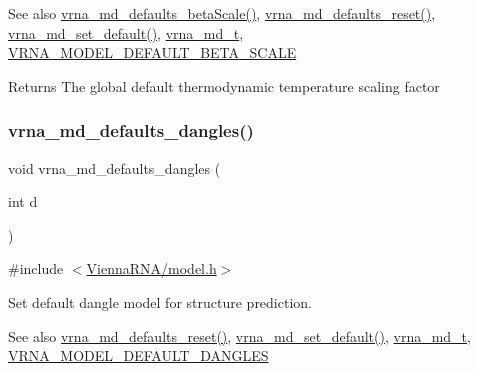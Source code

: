 \begin{DoxySeeAlso}{See also}
\hyperlink{group__model__details_gae984567db36c3f9b8731ecc917abf3a2}{vrna\+\_\+md\+\_\+defaults\+\_\+beta\+Scale()}, \hyperlink{group__model__details_ga70834424cf804d149937de89f80ceb45}{vrna\+\_\+md\+\_\+defaults\+\_\+reset()}, \hyperlink{group__model__details_ga8ac6ff84936282436f822644bf841f66}{vrna\+\_\+md\+\_\+set\+\_\+default()}, \hyperlink{group__model__details_ga1f8a10e12a0a1915f2a4eff0b28ea17c}{vrna\+\_\+md\+\_\+t}, \hyperlink{group__model__details_ga383d3ac8d08c3b6221754b50871c1200}{V\+R\+N\+A\+\_\+\+M\+O\+D\+E\+L\+\_\+\+D\+E\+F\+A\+U\+L\+T\+\_\+\+B\+E\+T\+A\+\_\+\+S\+C\+A\+LE} 
\end{DoxySeeAlso}
\begin{DoxyReturn}{Returns}
The global default thermodynamic temperature scaling factor 
\end{DoxyReturn}
\mbox{\label{group__model__details_gac76a5374def8e5e4e644ff6e4cc72dee}} 
\subsubsection{\texorpdfstring{vrna\+\_\+md\+\_\+defaults\+\_\+dangles()}{vrna\_md\_defaults\_dangles()}}
{\footnotesize\ttfamily void vrna\+\_\+md\+\_\+defaults\+\_\+dangles (\begin{DoxyParamCaption}\item[{int}]{d }\end{DoxyParamCaption})}



{\ttfamily \#include $<$\hyperlink{model_8h}{Vienna\+R\+N\+A/model.\+h}$>$}



Set default dangle model for structure prediction. 

\begin{DoxySeeAlso}{See also}
\hyperlink{group__model__details_ga70834424cf804d149937de89f80ceb45}{vrna\+\_\+md\+\_\+defaults\+\_\+reset()}, \hyperlink{group__model__details_ga8ac6ff84936282436f822644bf841f66}{vrna\+\_\+md\+\_\+set\+\_\+default()}, \hyperlink{group__model__details_ga1f8a10e12a0a1915f2a4eff0b28ea17c}{vrna\+\_\+md\+\_\+t}, \hyperlink{group__model__details_ga2aa7bc2cae774b83a5c468f824c27a42}{V\+R\+N\+A\+\_\+\+M\+O\+D\+E\+L\+\_\+\+D\+E\+F\+A\+U\+L\+T\+\_\+\+D\+A\+N\+G\+L\+ES} 
\end{DoxySeeAlso}

